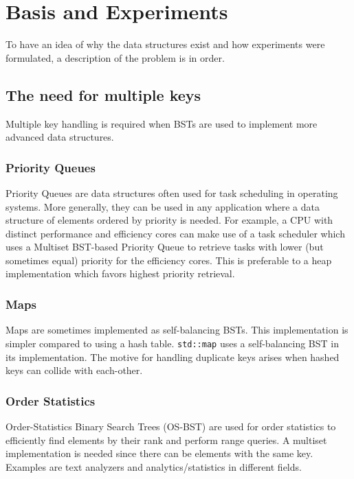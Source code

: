 \documentclass[fleqn,10pt]{SelfArx} %
\begin{document}

\section{Basis and Experiments}


To have an idea of why the data structures exist and how experiments were formulated, a description of the problem is in order.

\subsection{The need for multiple keys}
Multiple key handling is required when BSTs are used to implement more advanced data structures.  
\subsubsection{Priority Queues}
Priority Queues are data structures often used for task scheduling in operating systems. More generally, they can be used in any application where a data structure of elements ordered by priority is needed. For example, a CPU with distinct performance and efficiency cores can make use of a task scheduler which uses a Multiset BST-based Priority Queue to retrieve tasks with lower (but sometimes equal) priority for the efficiency cores. This is preferable to a heap implementation which favors highest priority retrieval.

\subsubsection{Maps}
Maps are sometimes implemented as self-balancing BSTs. This implementation is simpler compared to using a hash table. \verb|std::map| uses a self-balancing BST in its implementation. The motive for handling duplicate keys arises when hashed keys can collide with each-other.

\subsubsection{Order Statistics}
Order-Statistics Binary Search Trees (OS-BST) are used for order statistics to efficiently find elements by their rank and perform range queries. A multiset implementation is needed since there can be elements with the same key. Examples are text analyzers and analytics/statistics in different fields.
\end{document}
